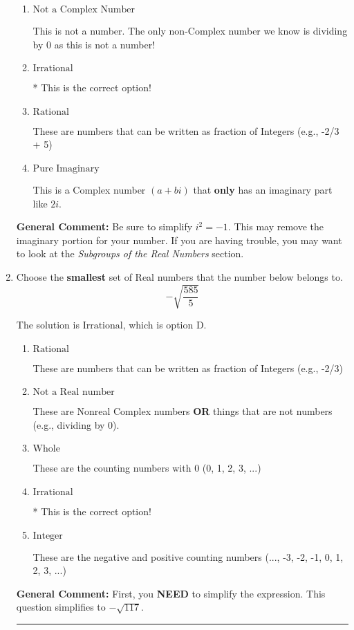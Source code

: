 \documentclass{extbook}[14pt]
\newcommand{\litem}[1]{\item #1

\rule{\textwidth}{0.4pt}}
\begin{document}
\begin{enumerate}
{\begin{enumerate}[label=\Alph*.]
This is a Complex number $(a+bi)$ that is not Real (has $i$ as part of the number).
\item \( \text{Not a Complex Number} \)

This is not a number. The only non-Complex number we know is dividing by 0 as this is not a number!
\item \( \text{Irrational} \)

* This is the correct option!
\item \( \text{Rational} \)

These are numbers that can be written as fraction of Integers (e.g., -2/3 + 5)
\item \( \text{Pure Imaginary} \)

This is a Complex number $(a+bi)$ that \textbf{only} has an imaginary part like $2i$.
\end{enumerate}

\textbf{General Comment:} Be sure to simplify $i^2 = -1$. This may remove the imaginary portion for your number. If you are having trouble, you may want to look at the \textit{Subgroups of the Real Numbers} section.
}
\litem{
Choose the \textbf{smallest} set of Real numbers that the number below belongs to.
\[ -\sqrt{\frac{585}{5}} \]

The solution is \( \text{Irrational} \), which is option D.\begin{enumerate}[label=\Alph*.]
\item \( \text{Rational} \)

These are numbers that can be written as fraction of Integers (e.g., -2/3)
\item \( \text{Not a Real number} \)

These are Nonreal Complex numbers \textbf{OR} things that are not numbers (e.g., dividing by 0).
\item \( \text{Whole} \)

These are the counting numbers with 0 (0, 1, 2, 3, ...)
\item \( \text{Irrational} \)

* This is the correct option!
\item \( \text{Integer} \)

These are the negative and positive counting numbers (..., -3, -2, -1, 0, 1, 2, 3, ...)
\end{enumerate}

\textbf{General Comment:} First, you \textbf{NEED} to simplify the expression. This question simplifies to $-\sqrt{117}$. 
 
}
\end{enumerate}
\end{document}
